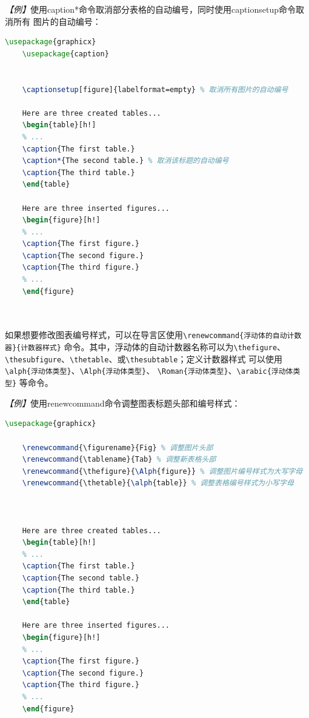 \emph{【例】}使用caption*命令取消部分表格的自动编号，同时使用captionsetup命令取消所有
图片的自动编号：
\begin{lstlisting}[language=TeX]
    \usepackage{graphicx}
    \usepackage{caption}
    

    \captionsetup[figure]{labelformat=empty} % 取消所有图片的自动编号

    Here are three created tables...
    \begin{table}[h!]
    % ...
    \caption{The first table.}
    \caption*{The second table.} % 取消该标题的自动编号
    \caption{The third table.}
    \end{table}

    Here are three inserted figures...
    \begin{figure}[h!]
    % ...
    \caption{The first figure.}
    \caption{The second figure.}
    \caption{The third figure.}
    % ...
    \end{figure}

    
\end{lstlisting}

如果想要修改图表编号样式，可以在导言区使用\texttt{\textbackslash{}renewcommand\{浮动体的自动计数器\}\{计数器样式\}}
命令。其中，浮动体的自动计数器名称可以为\texttt{\textbackslash{}thefigure}、\texttt{\textbackslash{}thesubfigure}、\texttt{\textbackslash{}thetable}、或\texttt{\textbackslash{}thesubtable}；定义计数器样式
可以使用\texttt{\textbackslash{}alph\{浮动体类型\}}、\texttt{\textbackslash{}Alph\{浮动体类型\}}、
\texttt{\textbackslash{}Roman\{浮动体类型\}}、\texttt{\textbackslash{}arabic\{浮动体类型\}}
等命令。

\emph{【例】}使用renewcommand命令调整图表标题头部和编号样式：
\begin{lstlisting}[language=TeX]
    \usepackage{graphicx}

    \renewcommand{\figurename}{Fig} % 调整图片头部
    \renewcommand{\tablename}{Tab} % 调整新表格头部
    \renewcommand{\thefigure}{\Alph{figure}} % 调整图片编号样式为大写字母
    \renewcommand{\thetable}{\alph{table}} % 调整表格编号样式为小写字母

    

    Here are three created tables...
    \begin{table}[h!]
    % ...
    \caption{The first table.}
    \caption{The second table.}
    \caption{The third table.}
    \end{table}

    Here are three inserted figures...
    \begin{figure}[h!]
    % ...
    \caption{The first figure.}
    \caption{The second figure.}
    \caption{The third figure.}
    % ...
    \end{figure}

    
\end{lstlisting}

